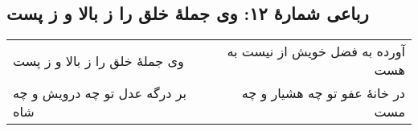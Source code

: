 \begin{center}
\section*{رباعی شمارهٔ ۱۲: وی جملۀ خلق را ز بالا و ز پست}
\label{sec:012}
\begin{longtable}{l p{0.5cm} r}
وی جملهٔ خلق را ز بالا و ز پست
&&
آورده به فضل خویش از نیست به هست
\\
بر درگه عدل تو چه درویش و چه شاه
&&
در خانهٔ عفو تو چه هشیار و چه مست
\\
\end{longtable}
\end{center}
